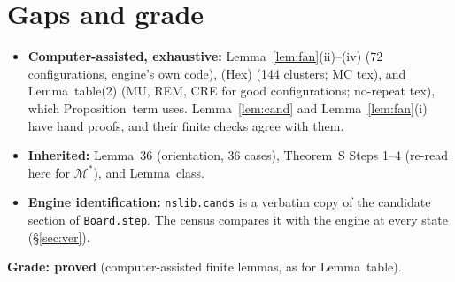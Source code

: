 \documentclass[11pt]{article}
\theoremstyle{definition}\newtheorem{definition}[theorem]{Definition}\newtheorem{remark}[theorem]{Remark}
\newcommand{\M}{\mathcal M}
\begin{document}
\section{Gaps and grade}\label{sec:gaps}
\begin{itemize}
\item \textbf{Computer-assisted, exhaustive:} Lemma~\ref{lem:fan}(ii)--(iv) (72 configurations, engine's own code), (Hex) (144 clusters; MC tex), and Lemma~table(2) (MU, REM, CRE for good configurations; no-repeat tex), which Proposition~term uses. Lemma~\ref{lem:cand} and Lemma~\ref{lem:fan}(i) have hand proofs, and their finite checks agree with them.
\item \textbf{Inherited:} Lemma~36 (orientation, 36 cases), Theorem~S Steps 1--4 (re-read here for $\M^*$), and Lemma~class.
\item \textbf{Engine identification:} \texttt{nslib.cands} is a verbatim copy of the candidate section of \texttt{Board.step}. The census compares it with the engine at every state (\S\ref{sec:ver}).
\end{itemize}
\textbf{Grade: proved} (computer-assisted finite lemmas, as for Lemma~table).
\end{document}
